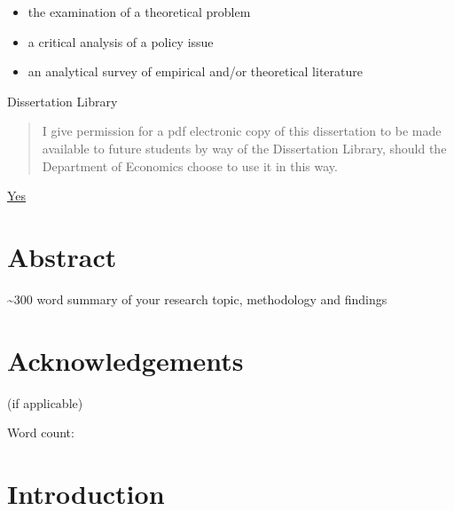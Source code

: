 \documentclass{article}
\begin{document}
\begin{itemize}[label=$\square$, leftmargin=2em, itemsep=2pt, topsep=0.5em] 
    \item the examination of a theoretical problem 
    \item a critical analysis of a policy issue 
    \item an analytical survey of empirical and/or theoretical literature
\end{itemize}

\vspace{2cm} 

\begin{center} 
    Dissertation Library 
\end{center} 

\begin{quote} I give permission for a pdf electronic copy of this dissertation to be made available to future students by way of the Dissertation Library, should the Department of Economics choose to use it in this way. 
\end{quote} 

\begin{center} 
    \underline{Yes}
\end{center} 

\newpage
\section*{Abstract} 
\begin{center} 
    \textasciitilde300 word summary of your research topic, methodology and findings 
\end{center} 

\vfill 

\section*{Acknowledgements} 

(if applicable) 

\vspace{2cm} 

\noindent Word count: 

\newpage 
\tableofcontents 

\newpage 
\listoffigures 


\newpage
\section{Introduction}

\newpage
\end{document}
